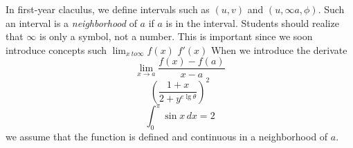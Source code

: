 \documentclass{sample}
\begin{document}
    In first-year claculus, we define intervals such as $(u, v)$ and $(u, \infty a, \phi)$. Such an interval
    is a \emph{neighborhood} of $a$ if $a$ is in the interval. Students should realize that $\infty$ is 
    only a symbol, not a number. 
    This is important since we soon introduce concepts such $\lim_{x \ to \infty} f(x)$
    $f'(x)$
    When we introduce the derivate 
    \[
        \lim_{x \to a} \frac{f(x) - f(a)}{x - a}
    \]
    \[
        \left(\frac{1 + x}{2 + y^{e\lg\theta}}\right)^{2}
    \]
    \[
        \int_{0}^{\pi} \sin x \, dx = 2  
    \]
    we assume that the function is defined and continuous in a neighborhood of $a$.
\end{document}
